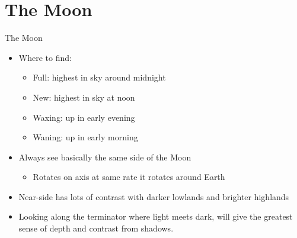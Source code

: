 \documentclass[pdf, ]{beamer}
\begin{document}
\section{The Moon}

\begin{frame}{The Moon}
	\begin{itemize}
		\item Where to find:
			\begin{itemize}
				\item Full: highest in sky around midnight
				\item New: highest in sky at noon
				\item Waxing: up in early evening
				\item Waning: up in early morning
			\end{itemize}
		\item Always see basically the same side of the Moon
			\begin{itemize}
				\item Rotates on axis at same rate it rotates around Earth
			\end{itemize}
		\item Near-side has lots of contrast with darker lowlands and brighter highlands
		\item Looking along the \alert{terminator} where light meets dark, will give the greatest sense of depth and contrast from shadows.
	\end{itemize}
\end{frame}
\end{document}
